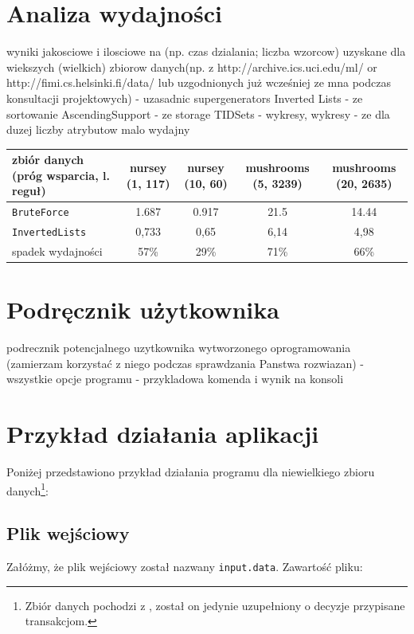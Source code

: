 \documentclass[a4paper,10pt]{article}
\begin{document}
\section{Analiza wydajności}
wyniki jakosciowe i ilosciowe na (np. czas dzialania; liczba wzorcow)
uzyskane dla wiekszych (wielkich) zbiorow danych(np. z
http://archive.ics.uci.edu/ml/ or http://fimi.cs.helsinki.fi/data/ lub
uzgodnionych już wcześniej ze mna podczas konsultacji projektowych)
- uzasadnic supergenerators Inverted Lists
- ze sortowanie AscendingSupport
- ze storage TIDSets
- wykresy, wykresy
- ze dla duzej liczby atrybutow malo wydajny

\begin{center}
 \begin{tabular}{ | l || c | c | c | c | }
   \hline
   zbiór danych (próg wsparcia, l. reguł) & nursey (1, 117) & nursey (10, 60) & mushrooms (5, 3239) & mushrooms (20, 2635) \\
   \hline
   \verb+BruteForce+            & 1.687           & 0.917           & 21.5                & 14.44                \\
   \hline
   \verb+InvertedLists+         & 0,733           & 0,65            & 6,14                & 4,98                 \\
   \hline
   spadek wydajności            & 57\%            & 29\%            & 71\%                & 66\%                 \\
   \hline
 \end{tabular}
\end{center}


\section{Podręcznik użytkownika}
podrecznik potencjalnego uzytkownika wytworzonego oprogramowania
(zamierzam korzystać z niego podczas sprawdzania Panstwa rozwiazan)
- wszystkie opcje programu
- przykladowa komenda i wynik na konsoli



\section{Przykład działania aplikacji} \label{sec:example}
Poniżej przedstawiono przykład działania programu dla niewielkiego zbioru danych\footnote{Zbiór danych pochodzi z \cite{grm}, został on jedynie uzupełniony o decyzje przypisane transakcjom.}:

 \subsection{Plik wejściowy}
 Załóżmy, że plik wejściowy został nazwany \verb+input.data+.
 Zawartość pliku:
\end{document}
